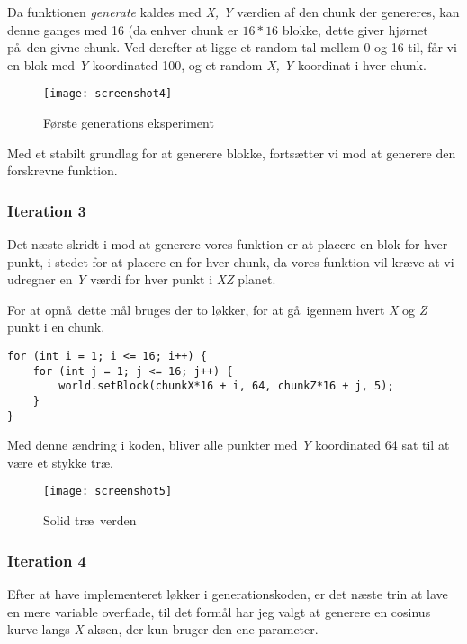 \documentclass[a4paper,12pt]{report}
\begin{document}
			Da funktionen \emph{generate} kaldes med \emph{X, Y} v\ae rdien af den chunk der genereres, kan
			denne ganges med 16 (da enhver chunk er \(16 * 16\) blokke, dette giver hj\o rnet p\aa \ den givne chunk.
			Ved derefter at ligge et random tal mellem 0 og 16 til, f\aa r vi en blok med \emph{Y} koordinated 100, og et random \emph{X, Y}
			koordinat i hver chunk.

			\begin{wrapfigure}{r}{0.5\textwidth}
				\texttt{[image: screenshot4]}
				\caption{F\o rste generations eksperiment}
			\end{wrapfigure}

			Med et stabilt grundlag for at generere blokke, forts\ae tter vi mod at generere den forskrevne funktion.

		\subsubsection{Iteration 3}
			Det n\ae ste skridt i mod at generere vores funktion er at placere en blok for hver punkt, i stedet for at placere en
			for hver chunk, da vores funktion vil kr\ae ve at vi udregner en \emph{Y} v\ae rdi for hver punkt i \emph{XZ} planet.

			For at opn\aa \ dette m\aa l bruges der to l\o kker, for at g\aa \ igennem hvert \emph{X} og \emph{Z} punkt i en chunk.

\begin{lstlisting}[label=SRPWorldGenerator2,caption=SRPWorldGenerator.java]
for (int i = 1; i <= 16; i++) {
    for (int j = 1; j <= 16; j++) {
        world.setBlock(chunkX*16 + i, 64, chunkZ*16 + j, 5);
    }
}
\end{lstlisting}

			Med denne \ae ndring i koden, bliver alle punkter med \emph{Y} koordinated 64 sat til at v\ae re et stykke tr\ae .

			\begin{wrapfigure}{r}{0.5\textwidth}
				\texttt{[image: screenshot5]}
				\caption{Solid tr\ae \ verden}
			\end{wrapfigure}

		\subsubsection{Iteration 4}
			Efter at have implementeret l\o kker i generationskoden, er det n\ae ste trin at lave en mere variable overflade,
			til det form\aa l har jeg valgt at generere en cosinus kurve langs \emph{X} aksen, der kun bruger den ene parameter.
\end{document}
